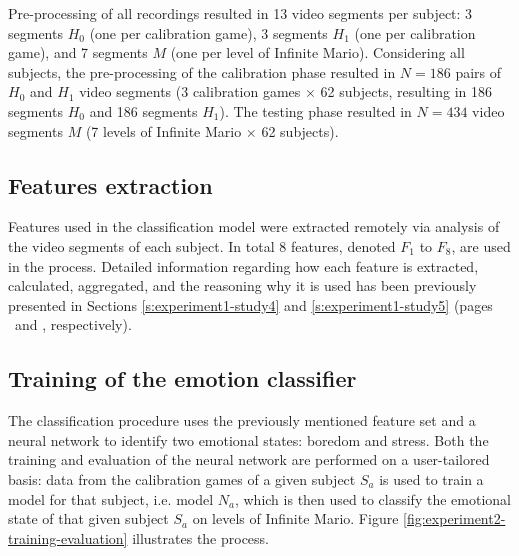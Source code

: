 Pre-processing of all recordings resulted in 13 video segments per subject: 3 segments $H_0$ (one per calibration game), 3 segments $H_1$ (one per calibration game), and 7 segments $M$ (one per level of Infinite Mario). Considering all subjects, the pre-processing of the calibration phase resulted in $N=186$ pairs of $H_0$ and $H_1$ video segments (3 calibration games $\times$ 62 subjects, resulting in 186 segments $H_0$ and 186 segments $H_1$). The testing phase resulted in $N=434$ video segments $M$ (7 levels of Infinite Mario $\times$ 62 subjects).

\subsection{Features extraction}

Features used in the classification model were extracted remotely via analysis of the video segments of each subject. In total 8 features, denoted $F_1$ to $F_8$, are used in the process. Detailed information regarding how each feature is extracted, calculated, aggregated, and the reasoning why it is used has been previously presented in Sections \ref{s:experiment1-study4} and \ref{s:experiment1-study5} (pages \pageref{s:experiment1-study4}\ and \pageref{s:experiment1-study5}, respectively).


\subsection{Training of the emotion classifier}

The classification procedure uses the previously mentioned feature set and a neural network to identify two emotional states: boredom and stress. Both the training and evaluation of the neural network are performed on a user-tailored basis: data from the calibration games of a given subject $S_a$ is used to train a model for that subject, i.e. model $N_a$, which is then used to classify the emotional state of that given subject $S_a$ on levels of Infinite Mario. Figure \ref{fig:experiment2-training-evaluation} illustrates the process.

